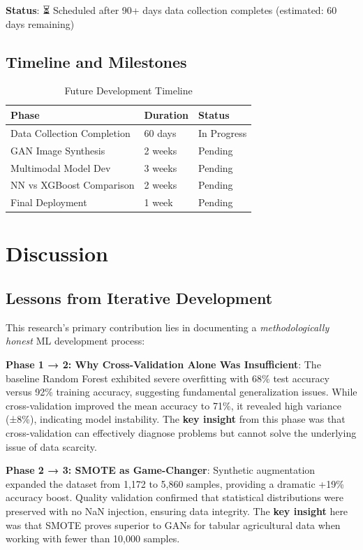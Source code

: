 \documentclass[10pt,twocolumn]{article}
\begin{document}
\textbf{Status}: ⏳ Scheduled after 90+ days data collection completes (estimated: 60 days remaining)

\subsection{Timeline and Milestones}

\begin{table}[H]
\centering
\caption{Future Development Timeline}
\begin{tabular}{lll}
\toprule
\textbf{Phase} & \textbf{Duration} & \textbf{Status} \\
\midrule
Data Collection Completion & 60 days & In Progress \\
GAN Image Synthesis        & 2 weeks & Pending \\
Multimodal Model Dev       & 3 weeks & Pending \\
NN vs XGBoost Comparison   & 2 weeks & Pending \\
Final Deployment           & 1 week  & Pending \\
\bottomrule
\end{tabular}
\end{table}

\section{Discussion}

\subsection{Lessons from Iterative Development}

This research's primary contribution lies in documenting a \textit{methodologically honest} ML development process:

\textbf{Phase 1 → 2: Why Cross-Validation Alone Was Insufficient}: The baseline Random Forest exhibited severe overfitting with 68\% test accuracy versus 92\% training accuracy, suggesting fundamental generalization issues. While cross-validation improved the mean accuracy to 71\%, it revealed high variance (±8\%), indicating model instability. The \textbf{key insight} from this phase was that cross-validation can effectively diagnose problems but cannot solve the underlying issue of data scarcity.

\textbf{Phase 2 → 3: SMOTE as Game-Changer}: Synthetic augmentation expanded the dataset from 1,172 to 5,860 samples, providing a dramatic +19\% accuracy boost. Quality validation confirmed that statistical distributions were preserved with no NaN injection, ensuring data integrity. The \textbf{key insight} here was that SMOTE proves superior to GANs for tabular agricultural data when working with fewer than 10,000 samples.
\end{document}
